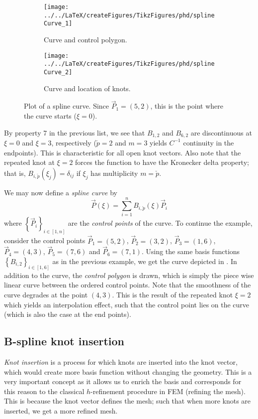 \begin{figure}
        \centering      
        \begin{subfigure}{0.49\textwidth}
       		\centering
			\texttt{[image: ../../LaTeX/createFigures/TikzFigures/phd/splineCurve\_1]}
            \caption{Curve and control polygon.}
        \end{subfigure}%
        \hspace*{0.02\textwidth}%
        \begin{subfigure}{0.49\textwidth}
       		\centering
			\texttt{[image: ../../LaTeX/createFigures/TikzFigures/phd/splineCurve\_2]}
            \caption{Curve and location of knots.}
        \end{subfigure}
        \caption[Plot of a spline curve]{Plot of a spline curve. Since $\vec{P}_1=(5,2)$, this is the point where the curve starts ($\xi=0$).}\label{Fig:splineCurve}
\end{figure}
By property 7 in the previous list, we see that $B_{1,2}$ and $B_{6,2}$ are discontinuous at $\xi = 0$ and $\xi = 3$, respectively ($\check{p}=2$ and $m=3$ yields $C^{-1}$ continuity in the endpoints). This is characteristic for all open knot vectors. Also note that the repeated knot at $\xi = 2$ forces the function to have the Kronecker delta property; that is, $B_{i,\check{p}}(\xi_j) = \delta_{ij}$ if $\xi_j$ has multiplicity $m=\check{p}$.

We may now define a \textit{spline curve} by
\begin{equation*}
	\vec{P}(\xi) = \sum_{i=1}^n B_{i,\check{p}}(\xi) \vec{P}_i
\end{equation*}
where $\left\{\vec{P}_i\right\}_{i\in[1,n]}$ are the \textit{control points} of the curve. To continue the example, consider the control points $\vec{P}_1=(5,2)$, $\vec{P}_2=(3,2)$, $\vec{P}_3=(1,6)$, $\vec{P}_4=(4,3)$, $\vec{P}_5=(7,6)$ and $\vec{P}_6=(7,1)$. Using the same basis functions $\left\{B_{i,2}\right\}_{i\in[1,6]}$ as in the previous example, we get the curve depicted in . In addition to the curve, the \textit{control polygon} is drawn, which is simply the piece wise linear curve between the ordered control points. Note that the smoothness of the curve degrades at the point $(4,3)$. This is the result of the repeated knot $\xi = 2$ which yields an interpolation effect, such that the control point lies on the curve (which is also the case at the end points).

\subsection{B-spline knot insertion}
\textit{Knot insertion} is a process for which knots are inserted into the knot vector, which would create more basis function without changing the geometry. This is a very important concept as it allows us to enrich the basis and corresponds for this reason to the classical $h$-refinement procedure in FEM (refining the mesh). This is because the knot vector defines the mesh; such that when more knots are inserted, we get a more refined mesh.

